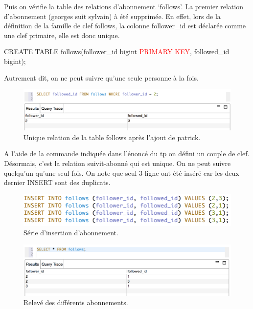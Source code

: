 Puis on vérifie la table des relations d'abonnement \lq follows\rq.
La premier relation d'abonnement (georges suit sylvain) à été supprimée.
En effet, lors de la définition de la famille de clef follows, la colonne
follower\_id est déclarée comme une clef primaire, elle est donc unique.\newline
\begin{tt}
CREATE TABLE follows(follower\_id bigint \textcolor{red}{PRIMARY KEY}, followed\_id bigint); \newline
\end{tt}
Autrement dit, on ne peut suivre qu'une seule personne à la fois.
\begin{figure}[h!]
\centering
\includegraphics[scale=0.6]{img/solo_key.png}
\caption{Unique relation de la table follows après l'ajout de patrick.}
\end{figure}
\par A l'aide de la commande indiquée dans l'énoncé du tp on défini un couple de clef.
Désormais, c'est la relation suivit-abonné qui est unique. On ne peut suivre quelqu'un 
qu'une seul fois. On note que seul 3 ligne ont été inséré car les deux dernier INSERT
sont des duplicats.
\begin{figure}[h!]
\centering
\includegraphics[scale=0.7]{img/all_follows.png}
\caption{Série d'insertion d'abonnement.}
\end{figure}

\begin{figure}[h!]
\centering
\includegraphics[scale=0.6]{img/follows_result.png}
\caption{Relevé des différents abonnements.}
\end{figure}

